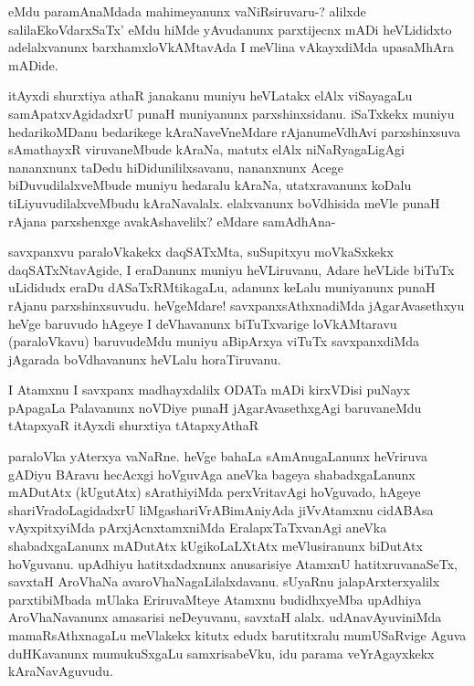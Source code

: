 \begin{artha}
eMdu paramAnaMdada mahimeyanunx vaNiRsiruvaru-? alilxde salilaEkoVdarxSaTx' eMdu hiMde yAvudanunx parxtijecnx mADi heVLididxto adelalxvanunx barxhamxloVkAMtavAda I meVlina vAkayxdiMda upasaMhAra mADide. 
\end{artha}

\begin{artha}
\stext itAyxdi shurxtiya athaR janakanu muniyu heVLatakx elAlx viSayagaLu samApatxvAgidadxrU punaH muniyanunx parxshinxsidanu. iSaTxkekx muniyu hedarikoMDanu bedarikege kAraNaveVneMdare rAjanumeVdhAvi parxshinxsuva sAmathayxR viruvaneMbude kAraNa, matutx elAlx niNaRyagaLigAgi nananxnunx taDedu hiDidunililxsavanu, nananxnunx Acege biDuvudilalxveMbude muniyu hedaralu kAraNa, utatxravanunx koDalu tiLiyuvudilalxveMbudu kAraNavalalx. elalxvanunx boVdhisida meVle punaH rAjana parxshenxge avakAshavelilx? eMdare samAdhAna-
\end{artha}

\begin{artha}
savxpanxvu paraloVkakekx daqSATxMta, suSupitxyu moVkaSxkekx daqSATxNtavAgide, I eraDanunx muniyu heVLiruvanu, Adare heVLide biTuTx uLididudx eraDu dASaTxRMtikagaLu, adanunx keLalu muniyanunx punaH rAjanu parxshinxsuvudu. heVgeMdare! savxpanxsAthxnadiMda jAgarAvasethxyu heVge baruvudo hAgeye I deVhavanunx biTuTxvarige loVkAMtaravu (paraloVkavu) baruvudeMdu muniyu aBipArxya viTuTx savxpanxdiMda jAgarada boVdhavanunx heVLalu horaTiruvanu. 
\end{artha}%

\begin{artha}
I Atamxnu I savxpanx madhayxdalilx ODATa mADi kirxVDisi puNayx pApagaLa Palavanunx noVDiye punaH jAgarAvasethxgAgi baruvaneMdu tAtapxyaR \stext itAyxdi shurxtiya tAtapxyAthaR
\end{artha}

\begin{artha}
paraloVka yAterxya vaNaRne. heVge bahaLa sAmAnugaLanunx heVriruva gADiyu BAravu hecAcxgi hoVguvAga aneVka bageya shabadxgaLanunx mADutAtx (kUgutAtx) sArathiyiMda perxVritavAgi hoVguvado, hAgeye shariVradoLagidadxrU liMgashariVrABimAniyAda jiVvAtamxnu cidABAsa vAyxpitxyiMda pArxjAcnxtamxniMda EralapxTaTxvanAgi aneVka shabadxgaLanunx mADutAtx kUgikoLaLXtAtx meVlusiranunx biDutAtx hoVguvanu. upAdhiyu hatitxdadxnunx anusarisiye AtamxnU hatitxruvanaSeTx, savxtaH AroVhaNa avaroVhaNagaLilalxdavanu. sUyaRnu jalapArxterxyalilx parxtibiMbada mUlaka EriruvaMteye Atamxnu budidhxyeMba upAdhiya AroVhaNavanunx amasarisi neDeyuvanu, savxtaH alalx. udAnavAyuviniMda mamaRsAthxnagaLu meVlakekx kitutx edudx barutitxralu mumUSaRvige Aguva duHKavanunx mumukuSxgaLu samxrisabeVku, idu parama veYrAgayxkekx kAraNavAguvudu.  
\end{artha}

